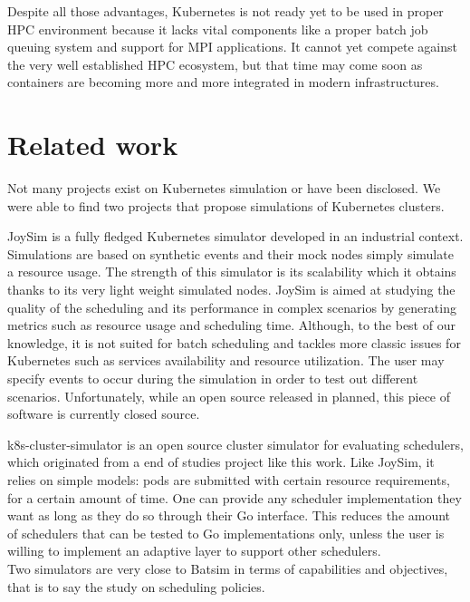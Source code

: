 Despite all those advantages, Kubernetes is not ready yet to be used in proper
HPC environment because it lacks vital components like a proper batch job
queuing system and support for MPI applications. It cannot yet compete against
the very well established HPC ecosystem, but that time may come soon as
containers are becoming more and more integrated in modern infrastructures.

\section{Related work}

Not many projects exist on Kubernetes simulation or have been disclosed. We
were able to find two projects that propose simulations of Kubernetes clusters.

JoySim \cite{joysim} is a fully fledged Kubernetes simulator developed in an
industrial context. Simulations are based on synthetic events and their mock
nodes simply simulate a resource usage. The strength of this simulator is its
scalability which it obtains thanks to its very light weight simulated nodes.
JoySim is aimed at studying the quality of the scheduling and its performance
in complex scenarios by generating metrics such as resource usage and
scheduling time. Although, to the best of our knowledge, it is not suited for
batch scheduling and tackles more classic issues for Kubernetes such as
services availability and resource utilization.  The user may specify events to
occur during the simulation in order to test out different scenarios.
Unfortunately, while an open source released in planned, this piece of software
is currently closed source.

k8s-cluster-simulator \cite{k8s-cluster-simulator} is an open source cluster
simulator for evaluating schedulers, which originated from a end of studies
project like this work. Like JoySim, it relies on simple models: pods are
submitted with certain resource requirements, for a certain amount of time. One
can provide any scheduler implementation they want as long as they do so
through their Go interface. This reduces the amount of schedulers that can be
tested to Go implementations only, unless the user is willing to
implement an adaptive layer to support other schedulers.\\

Two simulators are very close to Batsim in terms of capabilities and
objectives, that is to say the study on scheduling policies.

